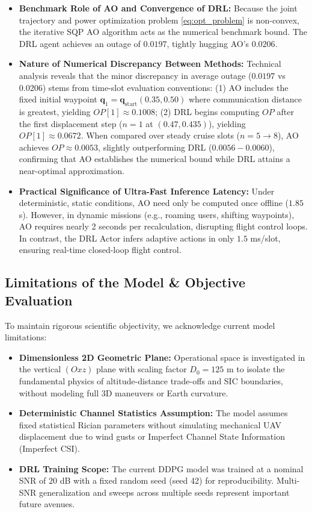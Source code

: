 \begin{itemize}
    \item \textbf{Benchmark Role of AO and Convergence of DRL:} Because the joint trajectory and power optimization problem \eqref{eq:opt_problem} is non-convex, the iterative SQP AO algorithm acts as the numerical benchmark bound. The DRL agent achieves an outage of $0.0197$, tightly hugging AO's $0.0206$.
    \item \textbf{Nature of Numerical Discrepancy Between Methods:} Technical analysis reveals that the minor discrepancy in average outage ($0.0197$ vs $0.0206$) stems from time-slot evaluation conventions: (1) AO includes the fixed initial waypoint $\mathbf{q}_1 = \mathbf{q}_{\text{start}}(0.35, 0.50)$ where communication distance is greatest, yielding $OP[1] \approx 0.1008$; (2) DRL begins computing $OP$ after the first displacement step ($n = 1$ at $(0.47, 0.435)$), yielding $OP[1] \approx 0.0672$. When compared over steady cruise slots ($n = 5 \to 8$), AO achieves $OP \approx 0.0053$, slightly outperforming DRL ($0.0056 - 0.0060$), confirming that AO establishes the numerical bound while DRL attains a near-optimal approximation.
    \item \textbf{Practical Significance of Ultra-Fast Inference Latency:} Under deterministic, static conditions, AO need only be computed once offline ($1.85$ s). However, in dynamic missions (e.g., roaming users, shifting waypoints), AO requires nearly 2 seconds per recalculation, disrupting flight control loops. In contrast, the DRL Actor infers adaptive actions in only $1.5$ ms/slot, ensuring real-time closed-loop flight control.
\end{itemize}

\subsection*{Limitations of the Model \& Objective Evaluation}

To maintain rigorous scientific objectivity, we acknowledge current model limitations:
\begin{itemize}
    \item \textbf{Dimensionless 2D Geometric Plane:} Operational space is investigated in the vertical $(Oxz)$ plane with scaling factor $D_0 = 125$ m to isolate the fundamental physics of altitude-distance trade-offs and SIC boundaries, without modeling full 3D maneuvers or Earth curvature.
    \item \textbf{Deterministic Channel Statistics Assumption:} The model assumes fixed statistical Rician parameters without simulating mechanical UAV displacement due to wind gusts or Imperfect Channel State Information (Imperfect CSI).
    \item \textbf{DRL Training Scope:} The current DDPG model was trained at a nominal SNR of $20$ dB with a fixed random seed (seed 42) for reproducibility. Multi-SNR generalization and sweeps across multiple seeds represent important future avenues.
\end{itemize}
